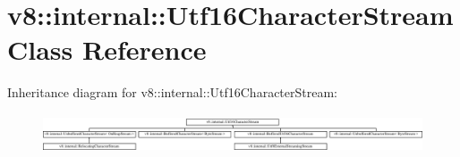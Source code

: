 \hypertarget{classv8_1_1internal_1_1Utf16CharacterStream}{}\section{v8\+:\+:internal\+:\+:Utf16\+Character\+Stream Class Reference}
\label{classv8_1_1internal_1_1Utf16CharacterStream}
Inheritance diagram for v8\+:\+:internal\+:\+:Utf16\+Character\+Stream\+:\begin{figure}[H]
\begin{center}
\leavevmode
\includegraphics[height=1.176471cm]{classv8_1_1internal_1_1Utf16CharacterStream}
\end{center}
\end{figure}

